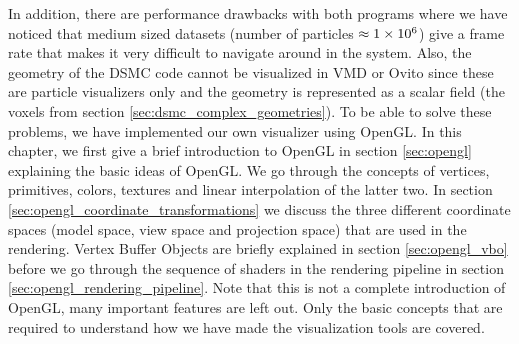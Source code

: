 In addition, there are performance drawbacks with both programs where we have noticed that medium sized datasets (number of particles $\approx 1\times 10^{6}$) give a frame rate that makes it very difficult to navigate around in the system. Also, the geometry of the DSMC code cannot be visualized in VMD or Ovito since these are particle visualizers only and the geometry is represented as a scalar field (the voxels from section \ref{sec:dsmc_complex_geometries}). To be able to solve these problems, we have implemented our own visualizer using OpenGL. In this chapter, we first give a brief introduction to OpenGL in section \ref{sec:opengl} explaining the basic ideas of OpenGL. We go through the concepts of vertices, primitives, colors, textures and linear interpolation of the latter two. In section \ref{sec:opengl_coordinate_transformations} we discuss the three different coordinate spaces (model space, view space and projection space) that are used in the rendering. Vertex Buffer Objects are briefly explained in section \ref{sec:opengl_vbo} before we go through the sequence of shaders in the rendering pipeline in section \ref{sec:opengl_rendering_pipeline}. Note that this is not a complete introduction of OpenGL, many important features are left out. Only the basic concepts that are required to understand how we have made the visualization tools are covered.
